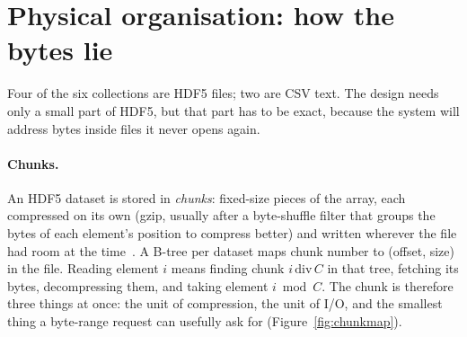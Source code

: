 \documentclass[10pt,a4paper]{article}
\begin{document}
\section{Physical organisation: how the bytes lie}
\label{ch:physical}

Four of the six collections are HDF5 files; two are CSV text. The design needs only a small part of HDF5, but that
part has to be exact, because the system will address bytes inside files it never opens again.

\paragraph{Chunks.} An HDF5 dataset is stored in \emph{chunks}: fixed-size pieces of the array, each compressed
on its own (gzip, usually after a byte-shuffle filter that groups the bytes of each element's position to compress
better) and written wherever the file had room at the time~\citep{hdf5format}. A B-tree per dataset maps chunk
number to (offset, size) in the file. Reading element $i$ means finding chunk $i\,\mathrm{div}\,C$ in that tree,
fetching its bytes, decompressing them, and taking element $i \bmod C$. The chunk is therefore three things at
once: the unit of compression, the unit of I/O, and the smallest thing a byte-range request can usefully ask for
(Figure~\ref{fig:chunkmap}).
\end{document}
